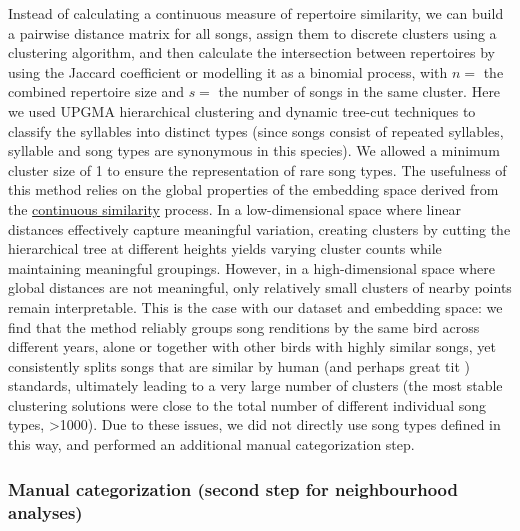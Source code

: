 \documentclass[9pt, onecolumn, twoside, lineno]{gsajnl}
\begin{document}
Instead of calculating a continuous measure of repertoire similarity, we can build a pairwise distance matrix for all songs, assign them to discrete clusters using a clustering algorithm, and then calculate the intersection between repertoires by using the Jaccard coefficient or modelling it as a binomial process, with $n = $ the combined repertoire size and $s = $ the number of songs in the same cluster. Here we used UPGMA hierarchical clustering and dynamic tree-cut techniques to classify the syllables into distinct types (since songs consist of repeated syllables, syllable and song types are synonymous in this species). We allowed a minimum cluster size of 1 to ensure the representation of rare song types. The usefulness of this method relies on the global properties of the embedding space derived from the \hyperref[sc:song-similarity]{continuous similarity} process. In a low-dimensional space where linear distances effectively capture meaningful variation, creating clusters by cutting the hierarchical tree at different heights yields varying cluster counts while maintaining meaningful groupings. However, in a high-dimensional space where global distances are not meaningful, only relatively small clusters of nearby points remain interpretable. This is the case with our dataset and embedding space: we find that the method reliably groups song renditions by the same bird across different years, alone or together with other birds with highly similar songs, yet consistently splits songs that are similar by human (and perhaps great tit \autocite{falls1982}) standards, ultimately leading to a very large number of clusters (the most stable clustering solutions were close to the total number of different individual song types, >1000). Due to these issues, we did not directly use song types defined in this way, and performed an additional manual categorization step.

\subsubsection{Manual categorization (second step for neighbourhood analyses)}
\label{sc:manual-categorization}
\end{document}
